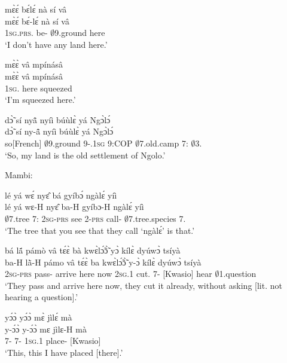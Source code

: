 \begin{exe}[(C234)]
\exC\label{225} 
  \glll  mɛ̀ɛ́ bɛ́lɛ́ nà sí vâ \\
         mɛ̀ɛ́ bɛ́-lɛ́ nà sí vâ \\
       1\textsc{sg}.\textsc{prs}.{\NEG} be-{\NEG} {\COM} $\emptyset$9.ground here   \\
    \trans `I don't have any land here.'
 
\exC\label{226}
  \glll mɛ̀ɛ̀ vâ mpínásâ\\
       mɛ̀ɛ̀ vâ mpínásâ \\
        1\textsc{sg}.{\COP} here squeezed  \\
    \trans `I'm squeezed here.'
 
\exC\label{227} 
  \glll dɔ̃̀ sí nyã̂ nyíì búùlɛ̀ yá Ngɔ̀lɔ́\\
        dɔ̃̀ sí ny-ã̂ nyíì búùlɛ̀ yá Ngɔ̀lɔ́ \\
        so[French] $\emptyset$9.ground 9-{\POSS}.1\textsc{sg} 9:COP $\emptyset$7.old.camp 7:{\ATT}  $\emptyset$3.{\PN}  \\
    \trans `So, my land is the old settlement of Ngolo.'
\end{exe}

\noindent Mambi:

\begin{exe}[(C234)]  
\exC\label{228} 
  \glll lé yá wɛ́ nyɛ̂ bá gyíbɔ́ ngàlɛ́ yíì \\
        lé yá wɛ-H nyɛ̂ ba-H gyíbɔ-H ngàlɛ́ yíì \\
       $\emptyset$7.tree 7:{\ATT}  2\textsc{sg}-\textsc{prs} see 2-\textsc{prs} call-{\R} $\emptyset$7.tree.species 7.{\COP}  \\
    \trans `The tree that you see that they call `ngàlɛ́' is that.'
 
\exC\label{229} 
  \glll bá lã́ pámò vâ tɛ́ɛ̀ bà kwɛ̀lɔ̃́ɔ̃̀ yɔ̀ kílɛ̀ dyúwɔ̀  tsíyà \\
      ba-H lã̀-H pámo vâ tɛ́ɛ̀ ba kwɛ̀lɔ̃́ɔ̃̀ y-ɔ̀ kílɛ̀ dyúwɔ̀  tsíyà \\
       2\textsc{sg}-\textsc{prs} pass-{\R} arrive here now 2\textsc{sg}.{\PST}1 cut.{\COMPL} 7-{\OBJ} {\NEG}[Kwasio] hear $\emptyset$1.question  \\
    \trans `They pass and arrive here now, they cut it already, without asking [lit. not hearing a question].'
 
\exC\label{230} 
  \glll  yɔ́ɔ̀ yɔ́ɔ̀ mɛ̀ jìlɛ́ mà \\
       y-ɔ́ɔ̀ y-ɔ́ɔ̀ mɛ jìlɛ-H mà \\
      7-{\OBJ} 7-{\OBJ} 1\textsc{sg}.{\PST}1 place-{\R} {\COMPL}[Kwasio]    \\
    \trans `This, this I have placed [there].'
\end{exe}

